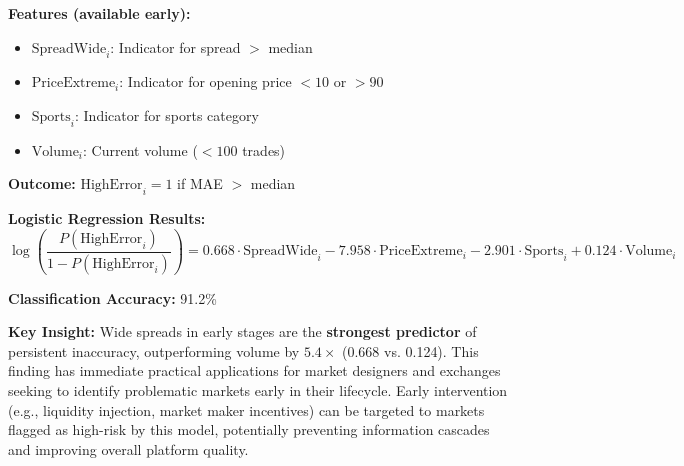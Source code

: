 \documentclass[12pt,letterpaper]{article}
\begin{document}
\textbf{Features (available early):}
\begin{itemize}
    \item $\text{SpreadWide}_i$: Indicator for spread $>$ median
    \item $\text{PriceExtreme}_i$: Indicator for opening price $<10$ or $>90$
    \item $\text{Sports}_i$: Indicator for sports category
    \item $\text{Volume}_i$: Current volume ($<100$ trades)
\end{itemize}

\textbf{Outcome:} $\text{HighError}_i = 1$ if MAE $>$ median

\textbf{Logistic Regression Results:}
\begin{equation}
\log\left(\frac{P(\text{HighError}_i)}{1 - P(\text{HighError}_i)}\right) = 
0.668 \cdot \text{SpreadWide}_i - 7.958 \cdot \text{PriceExtreme}_i - 2.901 \cdot \text{Sports}_i + 0.124 \cdot \text{Volume}_i
\end{equation}

\textbf{Classification Accuracy:} 91.2\%

\textbf{Key Insight:} Wide spreads in early stages are the \textbf{strongest predictor} 
of persistent inaccuracy, outperforming volume by $5.4\times$ (0.668 vs. 0.124). This finding has immediate practical applications for market designers and exchanges seeking to identify problematic markets early in their lifecycle. Early intervention (e.g., liquidity injection, market maker incentives) can be targeted to markets flagged as high-risk by this model, potentially preventing information cascades and improving overall platform quality.
\end{document}
